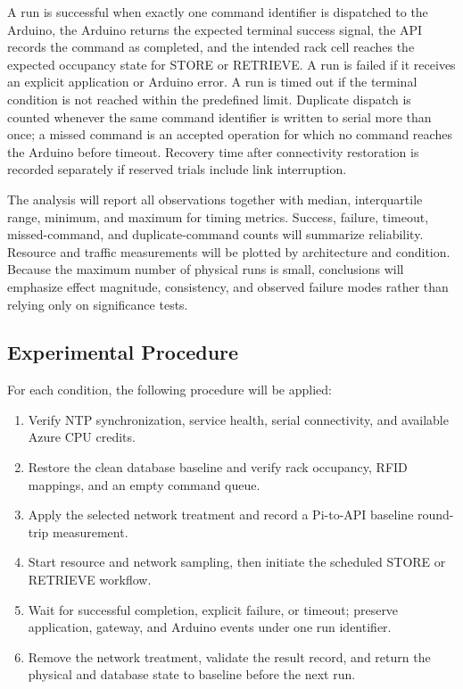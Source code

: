 \documentclass[conference]{IEEEtran}
\begin{document}
A run is successful when exactly one command identifier is dispatched to the Arduino, the Arduino returns the expected terminal success signal, the API records the command as completed, and the intended rack cell reaches the expected occupancy state for STORE or RETRIEVE. A run is failed if it receives an explicit application or Arduino error. A run is timed out if the terminal condition is not reached within the predefined limit. Duplicate dispatch is counted whenever the same command identifier is written to serial more than once; a missed command is an accepted operation for which no command reaches the Arduino before timeout. Recovery time after connectivity restoration is recorded separately if reserved trials include link interruption.

The analysis will report all observations together with median, interquartile range, minimum, and maximum for timing metrics. Success, failure, timeout, missed-command, and duplicate-command counts will summarize reliability. Resource and traffic measurements will be plotted by architecture and condition. Because the maximum number of physical runs is small, conclusions will emphasize effect magnitude, consistency, and observed failure modes rather than relying only on significance tests.

\subsection{Experimental Procedure}
For each condition, the following procedure will be applied:
\begin{enumerate}
    \item Verify NTP synchronization, service health, serial connectivity, and available Azure CPU credits.
    \item Restore the clean database baseline and verify rack occupancy, RFID mappings, and an empty command queue.
    \item Apply the selected network treatment and record a Pi-to-API baseline round-trip measurement.
    \item Start resource and network sampling, then initiate the scheduled STORE or RETRIEVE workflow.
    \item Wait for successful completion, explicit failure, or timeout; preserve application, gateway, and Arduino events under one run identifier.
    \item Remove the network treatment, validate the result record, and return the physical and database state to baseline before the next run.
\end{enumerate}
\end{document}
